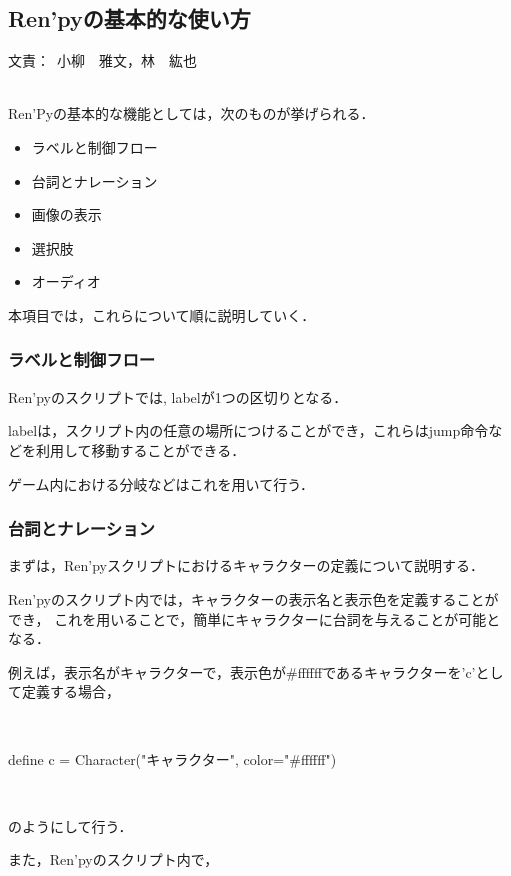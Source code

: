 \documentclass[a4paper]{jarticle}
\newcommand{\resp}[1]{\begin{flushright}文責：~#1\end{flushright}~\\}
\begin{document}
\fi

\subsection{Ren'pyの基本的な使い方}
  \resp{小柳　雅文，林　紘也}

  Ren'Pyの基本的な機能としては，次のものが挙げられる．

  \begin{itemize}
  \item ラベルと制御フロー
  \item 台詞とナレーション
  \item 画像の表示
  \item 選択肢
  \item オーディオ
  \end{itemize}

  本項目では，これらについて順に説明していく．

  \subsubsection{ラベルと制御フロー}

    Ren'pyのスクリプトでは, labelが1つの区切りとなる．
    
    labelは，スクリプト内の任意の場所につけることができ，これらはjump命令などを利用して移動することができる．
    
    ゲーム内における分岐などはこれを用いて行う．

  \subsubsection{台詞とナレーション}

    まずは，Ren'pyスクリプトにおけるキャラクターの定義について説明する．

    Ren'pyのスクリプト内では，キャラクターの表示名と表示色を定義することができ，
    これを用いることで，簡単にキャラクターに台詞を与えることが可能となる．

    例えば，表示名がキャラクターで，表示色が#ffffffであるキャラクターを'c'として定義する場合，

    ~

    define c = Character("キャラクター", color="#ffffff")

    ~

    のようにして行う．

    また，Ren'pyのスクリプト内で，

    ~
\end{document}
